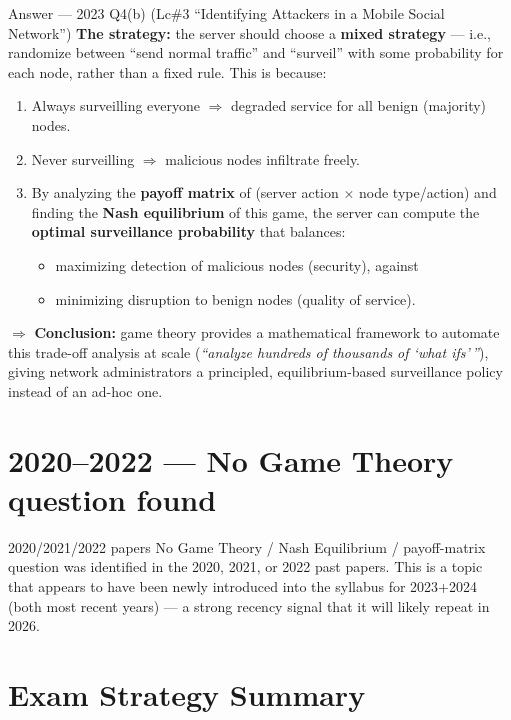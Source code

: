 \documentclass[12pt,a4paper]{article}
\begin{document}
\begin{solbox}{Answer --- 2023 Q4(b) (Lc\#3 ``Identifying Attackers in a Mobile Social Network'')}
\textbf{The strategy:} the server should choose a \textbf{mixed strategy} --- i.e., randomize between ``send normal traffic'' and ``surveil'' with some probability for each node, rather than a fixed rule. This is because:
\begin{enumerate}[noitemsep]
  \item Always surveilling everyone $\Rightarrow$ degraded service for all benign (majority) nodes.
  \item Never surveilling $\Rightarrow$ malicious nodes infiltrate freely.
  \item By analyzing the \textbf{payoff matrix} of (server action $\times$ node type/action) and finding the \textbf{Nash equilibrium} of this game, the server can compute the \textbf{optimal surveillance probability} that balances:
  \begin{itemize}[noitemsep]
    \item maximizing detection of malicious nodes (security), against
    \item minimizing disruption to benign nodes (quality of service).
  \end{itemize}
\end{enumerate}

$\Rightarrow$ \textbf{Conclusion:} game theory provides a mathematical framework to automate this trade-off analysis at scale (\emph{``analyze hundreds of thousands of `what ifs'\,''}), giving network administrators a principled, equilibrium-based surveillance policy instead of an ad-hoc one.
\end{solbox}

\section*{2020--2022 --- No Game Theory question found}
\begin{warnbox}{2020/2021/2022 papers}
No Game Theory / Nash Equilibrium / payoff-matrix question was identified in the 2020, 2021, or 2022 past papers. This is a topic that appears to have been newly introduced into the syllabus for 2023+2024 (both most recent years) --- a strong recency signal that it will likely repeat in 2026.
\end{warnbox}

\section*{Exam Strategy Summary}
\end{document}
